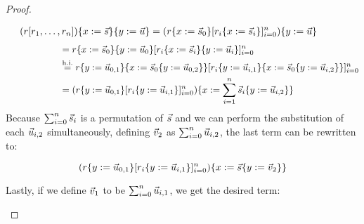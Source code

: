 \begin{proof}
\begin{enumerate}
\begin{equation*}\begin{split}
  (r [r_1,\hdots,r_n])\{x := \vec{s}\}\{y := \vec{u}\}
     & = (r\{x := \vec{s}_0\} [r_i\{x := \vec{s}_i\}]_{i=0}^n)\{y := \vec{u}\} \hspace{1cm}\\
\end{split}\end{equation*}
\begin{equation*}\begin{split}
\hspace{2cm} & = r\{x := \vec{s}_0\}\{y := \vec{u}_0\}
               [r_i\{x := \vec{s}_i\}\{y := \vec{u}_i\}]_{i=0}^n \\
     & \overset{\mathrm{h.i.}}{=} r\{y := \vec{u}_{0,1}\}\{x := \vec{s}_0\{y := \vec{u}_{0,2}\}\}
            [r_i\{y := \vec{u}_{i,1}\}\{x := \vec{s}_0\{y := \vec{u}_{i,2}\}\}]_{i=0}^n \\
     & = (r\{y := \vec{u}_{0,1}\}
                     [r_i\{y := \vec{u}_{i,1}\}]_{i=0}^n)\{x := \sum_{i=1}^n \vec{s}_i\{y := \vec{u}_{i,2}\}\} \\
\end{split}\end{equation*}
\noindent Because $\sum_{i=0}^n \vec{s}_i$ is a permutation of $\vec{s}$ and
we can perform the substitution of each $\vec{u}_{i,2}$ simultaneously, defining
$\vec{v}_2$ as $\sum_{i=0}^n \vec{u}_{i,2}$, the last term can be rewritten to:

\[
  (r\{y := \vec{u}_{0,1}\}
           [r_i\{y := \vec{u}_{i,1}\}]_{i=0}^n)\{x := \vec{s}\{y := \vec{v}_2\}\} \\
\]

\noindent Lastly, if we define $\vec{v}_1$ to be $\sum_{i=0}^n \vec{u}_{i,1}$,
we get the desired term:


\end{enumerate}
\end{proof}
